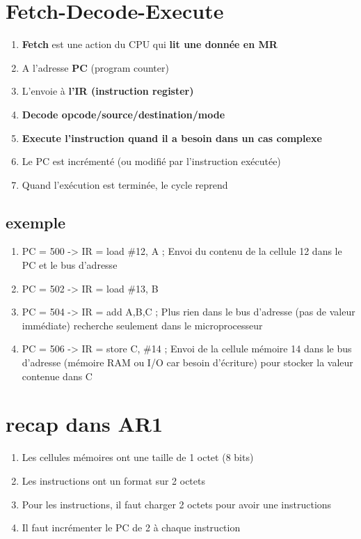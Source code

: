 \section{Fetch-Decode-Execute}
\begin{enumerate}
  \item \textbf{Fetch} est une action du CPU qui \textbf{lit une donnée en MR}
  \item A l'adresse \textbf{PC} (program counter)
  \item L'envoie à \textbf{l'IR (instruction register)} 
  \item \textbf{Decode opcode/source/destination/mode}
  \item \textbf{Execute l'instruction quand il a besoin dans un cas complexe}
  \item Le PC est incrémenté (ou modifié par l'instruction exécutée)
  \item Quand l'exécution est terminée, le cycle reprend
\end{enumerate}

\subsection{exemple}
\begin{enumerate}
\item PC = 500 -> IR = load \#12, A ; Envoi du contenu de la cellule 12 dans le PC et le bus d'adresse
\item PC = 502 -> IR = load \#13, B
\item PC = 504 -> IR = add A,B,C ; Plus rien dans le bus d'adresse (pas de valeur immédiate) recherche seulement dans le microprocesseur
\item PC = 506 -> IR = store C, \#14 ; Envoi de la cellule mémoire 14 dans le bus d'adresse (mémoire RAM ou I/O car besoin d'écriture) pour stocker la valeur contenue dans C  
\end{enumerate}

\section{recap dans AR1}
\begin{enumerate}
\item Les cellules mémoires ont une taille de 1 octet (8 bits)
\item Les instructions ont un format sur 2 octets
\item Pour les instructions, il faut charger 2 octets pour avoir une instructions
\item Il faut incrémenter le PC de 2 à chaque instruction
\end{enumerate}

